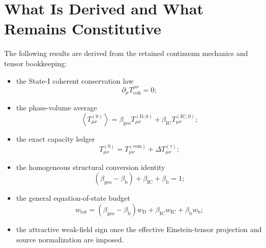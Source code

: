 \section{What Is Derived and What Remains Constitutive}

The following results are derived from the retained continuum mechanics and tensor bookkeeping:
\begin{itemize}
    \item the State-I coherent conservation law
    \begin{equation}
        \partial_\mu T_{\mathrm{coh}}^{\mu\nu}=0;
    \end{equation}
    \item the phase-volume average
    \begin{equation}
        \left\langle T_{\mu\nu}^{(0)} \right\rangle = \beta_{\mathrm{geo}} T_{\mu\nu}^{(\mathrm{D},0)} + \beta_{\mathrm{IC}} T_{\mu\nu}^{(\mathrm{IC},0)};
    \end{equation}
    \item the exact capacity ledger
    \begin{equation}
        T_{\mu\nu}^{(0)} = T_{\mu\nu}^{(\mathrm{rem})} + \Delta T_{\mu\nu}^{(\tau)};
    \end{equation}
    \item the homogeneous structural conversion identity
    \begin{equation}
        \left( \beta_{\mathrm{geo}} - \beta_{\mathrm{b}} \right) + \beta_{\mathrm{IC}} + \beta_{\mathrm{b}} = 1;
    \end{equation}
    \item the general equation-of-state budget
    \begin{equation}
        w_{\mathrm{tot}} = \left( \beta_{\mathrm{geo}} - \beta_{\mathrm{b}} \right)w_{\mathrm{D}} + \beta_{\mathrm{IC}}w_{\mathrm{IC}} + \beta_{\mathrm{b}}w_{\mathrm{b}};
    \end{equation}
    \item the attractive weak-field sign once the effective Einstein-tensor projection and source normalization are imposed.
\end{itemize}

